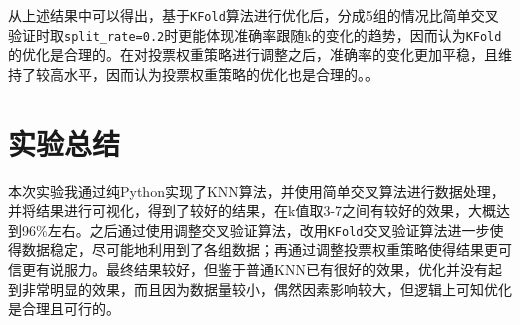 \documentclass[utf-8]{article}
\begin{document}
\newpage
从上述结果中可以得出，基于\verb|KFold|算法进行优化后，分成5组的情况比简单交叉验证时取\verb|split_rate=0.2|时更能体现准确率跟随k的变化的趋势，因而认为\verb|KFold|的优化是合理的。在对投票权重策略进行调整之后，准确率的变化更加平稳，且维持了较高水平，因而认为投票权重策略的优化也是合理的。。

\section{实验总结}
本次实验我通过纯Python实现了KNN算法，并使用简单交叉算法进行数据处理，并将结果进行可视化，得到了较好的结果，在k值取3-7之间有较好的效果，大概达到96\%左右。之后通过使用调整交叉验证算法，改用\verb|KFold|交叉验证算法进一步使得数据稳定，尽可能地利用到了各组数据；再通过调整投票权重策略使得结果更可信更有说服力。最终结果较好，但鉴于普通KNN已有很好的效果，优化并没有起到非常明显的效果，而且因为数据量较小，偶然因素影响较大，但逻辑上可知优化是合理且可行的。
\end{document}
